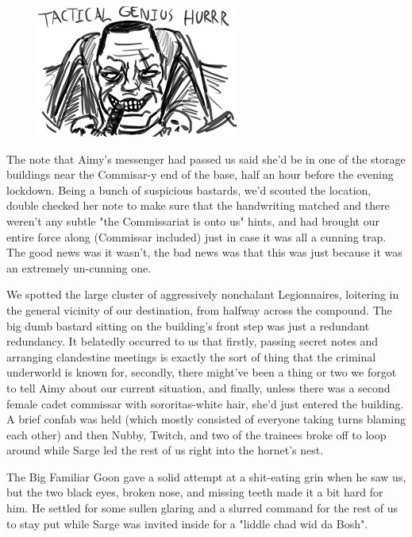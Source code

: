 \begin{figure}
	\begin{center}
		\includegraphics[width=\figwidth]{pics/21/42.png}
	\end{center}
\end{figure}
The note that Aimy's messenger had passed us said she'd be in one of the storage buildings near the Commisar-y end of the base, half an hour before the evening lockdown. 
Being a bunch of suspicious bastards, we'd scouted the location, double checked her note to make sure that the handwriting matched and there weren't any subtle "the Commissariat is onto us" hints, and had brought our entire force along (Commissar included) just in case it was all a cunning trap. 
The good news was it wasn't, the bad news was that this was just because it was an extremely un-cunning one.

We spotted the large cluster of aggressively nonchalant Legionnaires, loitering in the general vicinity of our destination, from halfway across the compound. 
The big dumb bastard sitting on the building's front step was just a redundant redundancy. 
It belatedly occurred to us that firstly, passing secret notes and arranging clandestine meetings is exactly the sort of thing that the criminal underworld is known for, secondly, there might've been a thing or two we forgot to tell Aimy about our current situation, and finally, unless there was a second female cadet commissar with sororitas-white hair, she'd just entered the building. 
A brief confab was held (which mostly consisted of everyone taking turns blaming each other) and then Nubby, Twitch, and two of the trainees broke off to loop around while Sarge led the rest of us right into the hornet's nest.

The Big Familiar Goon gave a solid attempt at a shit-eating grin when he saw us, but the two black eyes, broken nose, and missing teeth made it a bit hard for him. 
He settled for some sullen glaring and a slurred command for the rest of us to stay put while Sarge was invited inside for a "liddle chad wid da Bosh".

